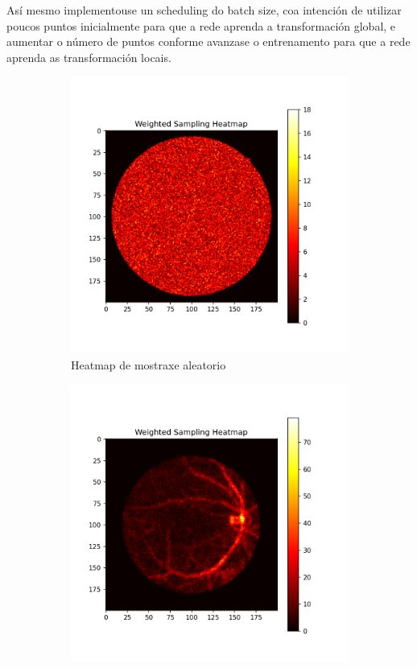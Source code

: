 Así mesmo implementouse un scheduling do batch size, coa intención de utilizar poucos puntos inicialmente para que a rede aprenda a transformación global, e aumentar o número de puntos conforme avanzase o entrenamento para que a rede aprenda as transformación locais.

\begin{figure}[]
    \centering
    \begin{subfigure}[b]{0.3\textwidth}
        \centering
        \includegraphics[width=\textwidth]{imaxes/random_sampling_heatmap.png}
        \caption{Heatmap de mostraxe aleatorio}
        \label{fig:random_sampling_heatmap}
    \end{subfigure}
    \hfill
    \begin{subfigure}[b]{0.3\textwidth}
        \centering
        \includegraphics[width=\textwidth]{imaxes/weighted_sampling_heatmap.png}

\end{subfigure}
\end{figure}
